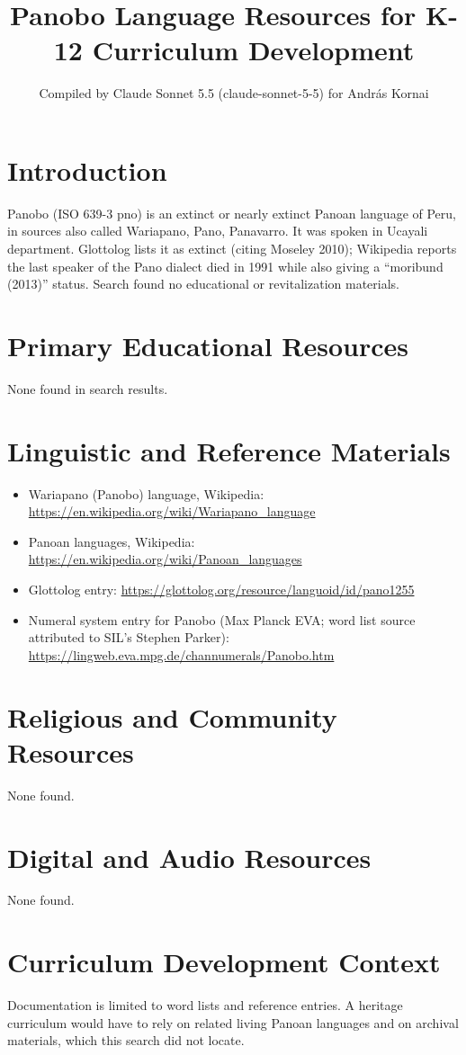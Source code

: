 \documentclass[12pt]{article}
\title{Panobo Language Resources for K-12 Curriculum Development}
\author{Compiled by Claude Sonnet 5.5 (claude-sonnet-5-5) for Andr\'as Kornai}
\date{}
\begin{document}
\maketitle

\section{Introduction}
Panobo (ISO 639-3 pno) is an extinct or nearly extinct Panoan language of Peru, in sources also called Wariapano, Pano, Panavarro. It was spoken in Ucayali department. Glottolog lists it as extinct (citing Moseley 2010); Wikipedia reports the last speaker of the Pano dialect died in 1991 while also giving a ``moribund (2013)'' status. Search found no educational or revitalization materials.

\section{Primary Educational Resources}
None found in search results.

\section{Linguistic and Reference Materials}
\begin{itemize}
\item Wariapano (Panobo) language, Wikipedia: \url{https://en.wikipedia.org/wiki/Wariapano_language}
\item Panoan languages, Wikipedia: \url{https://en.wikipedia.org/wiki/Panoan_languages}
\item Glottolog entry: \url{https://glottolog.org/resource/languoid/id/pano1255}
\item Numeral system entry for Panobo (Max Planck EVA; word list source attributed to SIL's Stephen Parker): \url{https://lingweb.eva.mpg.de/channumerals/Panobo.htm}
\end{itemize}

\section{Religious and Community Resources}
None found.

\section{Digital and Audio Resources}
None found.

\section{Curriculum Development Context}
Documentation is limited to word lists and reference entries. A heritage curriculum would have to rely on related living Panoan languages and on archival materials, which this search did not locate.
\end{document}
